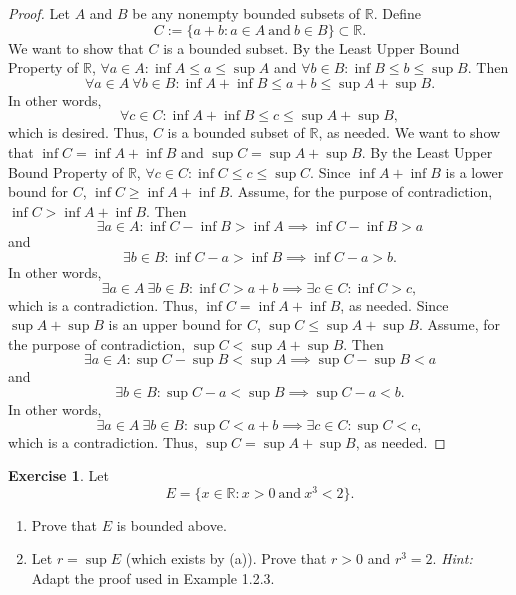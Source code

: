 \documentclass[12pt]{article}
\theoremstyle{definition}
\newtheorem{exercise}{Exercise}
\begin{document}
\begin{proof}
    Let $A$ and $B$ be any nonempty bounded subsets of $\mathbb{R}$. Define 
    \[
        C := \{a + b : a \in A \ \text{and} \ b \in B\} \subset \mathbb{R}. 
    \]
    We want to show that $C$ is a bounded subset. By the Least Upper Bound Property of $\mathbb{R}$, $\forall a \in A : \inf A \leq a \leq \sup A$ and $\forall b \in B : \inf B \leq b \leq \sup B$. Then
    \[
        \forall a \in A \ \forall b \in B : \inf A + \inf B \leq a + b \leq \sup A + \sup B.
    \]
    In other words,
    \[
        \forall c \in C : \inf A + \inf B \leq c \leq \sup A + \sup B,
    \]
    which is desired. Thus, $C$ is a bounded subset of $\mathbb{R}$, as needed. We want to show that $\inf C = \inf A + \inf B$ and $\sup C = \sup A + \sup B$. By the Least Upper Bound Property of $\mathbb{R}$, $\forall c \in C : \inf C \leq c \leq \sup C$. Since $\inf A + \inf B$ is a lower bound for $C$, $\inf C \geq \inf A + \inf B$. Assume, for the purpose of contradiction, $\inf C > \inf A + \inf B$. Then
    \[
        \exists a \in A : \inf C - \inf B > \inf A \implies \inf C - \inf B > a
    \]
    and
    \[
        \exists b \in B : \inf C - a > \inf B \implies \inf C - a > b.
    \]
    In other words,
    \[
        \exists a \in A \ \exists b \in B : \inf C > a + b \implies \exists c \in C : \inf C > c,
    \]
    which is a contradiction. Thus, $\inf C = \inf A + \inf B$, as needed. Since $\sup A + \sup B$ is an upper bound for $C$, $\sup C \leq \sup A + \sup B$. Assume, for the purpose of contradiction, $\sup C < \sup A + \sup B$. Then 
    \[
        \exists a \in A : \sup C - \sup B < \sup A \implies \sup C - \sup B < a
    \]
    and
    \[
        \exists b \in B : \sup C - a < \sup B \implies \sup C - a < b.
    \]
    In other words,
    \[
        \exists a \in A \ \exists b \in B : \sup C < a + b \implies \exists c \in C : \sup C < c,
    \]
    which is a contradiction. Thus, $\sup C = \sup A + \sup B$, as needed.
\end{proof}

\begin{exercise}
    Let
    \[
        E = \{x \in \mathbb{R} : x > 0 \ \text{and} \ x^3 < 2\}.
    \]
    \begin{enumerate}[label=(\alph*)]
        \item Prove that $E$ is bounded above.
        \item Let $r = \sup E$ (which exists by (a)). Prove that $r > 0$ and $r^3 = 2$. \textit{Hint:} Adapt the proof used in Example 1.2.3.
    \end{enumerate}
\end{exercise}
\end{document}
